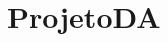 \chapter{Projeto\+DA}
\hypertarget{md__r_e_a_d_m_e}{}\label{md__r_e_a_d_m_e}
\label{md__r_e_a_d_m_e_autotoc_md0}%
%
